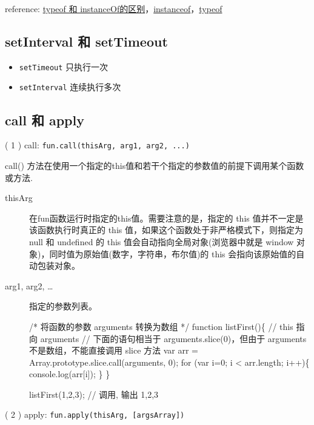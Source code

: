 reference: \href{http://segmentfault.com/a/1190000000730982}{typeof 和 instanceOf的区别}，\href{https://developer.mozilla.org/zh-CN/docs/Web/JavaScript/Reference/Operators/instanceof}{instanceof}，\href{https://developer.mozilla.org/zh-CN/docs/Web/JavaScript/Reference/Operators/typeof}{typeof}

\subsection{setInterval 和 setTimeout}\hypertarget{setinterval--settimeout}{}\label{setinterval--settimeout}

\begin{itemize}
\item \texttt{setTimeout} 只执行一次
\item \texttt{setInterval} 连续执行多次
\end{itemize}

\subsection{call 和 apply}\hypertarget{call--apply}{}\label{call--apply}

( 1 ) call: \texttt{fun.call(thisArg, arg1, arg2, ...)}

call() 方法在使用一个指定的this值和若干个指定的参数值的前提下调用某个函数或方法.

\begin{description}
\item[thisArg] 在fun函数运行时指定的this值。需要注意的是，指定的 this 值并不一定是该函数执行时真正的 this 值，如果这个函数处于非严格模式下，则指定为 null 和 undefined 的 this 值会自动指向全局对象(浏览器中就是 window 对象)，同时值为原始值(数字，字符串，布尔值)的 this 会指向该原始值的自动包装对象。



\item[arg1, arg2, \ldots{}] 指定的参数列表。


/* 将函数的参数 arguments 转换为数组 */
  function listFirst()\{
      // this 指向 arguments
      // 下面的语句相当于 arguments.slice(0)，但由于 arguments 不是数组，不能直接调用 slice 方法
      var arr = Array.prototype.slice.call(arguments, 0);
      for (var i=0; i \textless{} arr.length; i++)\{
          console.log(arr[i]);
      \}
  \}

listFirst(1,2,3); // 调用, 输出 1,2,3
\end{description}

( 2 ) apply: \texttt{fun.apply(thisArg, [argsArray])}

